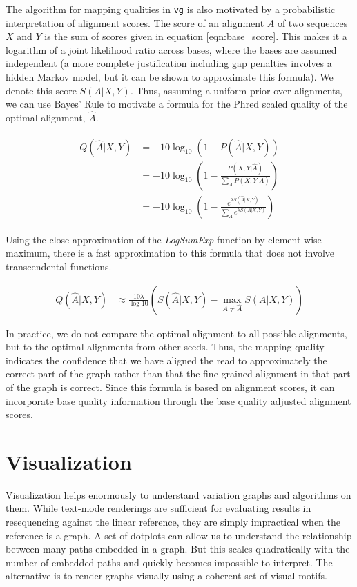 \documentclass[a4paper,12pt,numbered,oneside]{Classes/PhDThesisPSnPDF}
\begin{document}
The algorithm for mapping qualities in {\tt vg} is also motivated by a probabilistic interpretation of alignment scores.
The score of an alignment $A$ of two sequences $X$ and $Y$ is the sum of scores given in equation \ref{eqn:base_score}.
This makes it a logarithm of a joint likelihood ratio across bases, where the bases are assumed independent (a more complete justification including gap penalties involves a hidden Markov model, but it can be shown to approximate this formula).
We denote this score $S(A|X,Y)$.
Thus, assuming a uniform prior over alignments, we can use Bayes' Rule to motivate a formula for the Phred scaled quality of the optimal alignment, $\hat A$.

\begin{align}
\begin{split}
    Q(\hat A|X,Y) &= -10\log_{10}(1 - P(\hat A|X,Y)) \\
    &= -10 \log_{10}\left(1 - \frac{P(X,Y|\hat A)}{\sum_{A}P(X,Y|A)} \right) \\
    &= -10 \log_{10}\left(1 - \frac{e^{\lambda S(\hat A|X,Y)}}{\sum_{A}e^{\lambda S(A|X,Y)}} \right) \label{basicqualityscore}
\end{split}
\end{align}

Using the close approximation of the \emph{LogSumExp} function by element-wise maximum, there is a fast approximation to this formula that does not involve transcendental functions.

\begin{align}
    Q(\hat A|X,Y) &\approx \frac{10\lambda}{\log 10}\left( S(\hat A | X,Y) - \max_{A \neq \hat A}S(A| X,Y)\right)
\end{align}

In practice, we do not compare the optimal alignment to all possible alignments, but to the optimal alignments from other seeds. Thus, the mapping quality indicates the confidence that we have aligned the read to approximately the correct part of the graph rather than that the fine-grained alignment in that part of the graph is correct. Since this formula is based on alignment scores, it can incorporate base quality information through the base quality adjusted alignment scores.


\section{Visualization}

Visualization helps enormously to understand variation graphs and algorithms on them.
While text-mode renderings are sufficient for evaluating results in resequencing against the linear reference, they are simply impractical when the reference is a graph.
A set of dotplots can allow us to understand the relationship between many paths embedded in a graph.
But this scales quadratically with the number of embedded paths and quickly becomes impossible to interpret.
The alternative is to render graphs visually using a coherent set of visual motifs.
\end{document}
